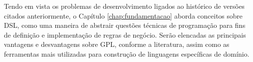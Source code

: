 



Tendo em vista os problemas de desenvolvimento ligados ao histórico de versões citados anteriormente, o Capítulo \ref{chap:fundamentacao} aborda conceitos sobre \gls{DSL}, como uma maneira de abstrair questões técnicas de programação para fins de definição e implementação de regras de negócio. Serão elencadas as principais vantagens e desvantagens sobre \gls{GPL}, conforme a literatura, assim como as ferramentas mais utilizadas para construção de linguagens específicas de domínio.




